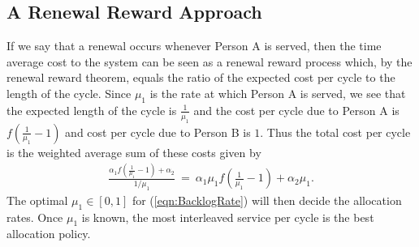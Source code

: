 \documentclass[10pt,a4paper]{article}
\begin{document}
\subsection{A Renewal Reward Approach}

If we say that a renewal occurs whenever Person A is served, then the time average cost to the system can be seen as a renewal reward process which, by the renewal reward theorem, equals the ratio of the  expected cost per cycle to the length of the cycle. Since $\mu_1$ is the rate at which Person A is served, we see that the expected length of the cycle is $\frac{1}{\mu_1}$ and the cost per cycle due to Person A is $f\left(\frac{1}{\mu_1}-1\right)$ and cost per cycle due to Person B is $1$. Thus the total cost per cycle is the weighted average sum of these costs given by  
\begin{align}
\label{eqn:BacklogRate}
\frac{\alpha_1f\left(\frac{1}{\mu_1}-1\right)+\alpha_2}{1/\mu_1} ~=~ \alpha_1 \mu_1 f\left(\frac{1}{\mu_1}-1\right)+\alpha_2 \mu_1.
\end{align}
%
%
%
%
%
%
%
%
The optimal $\mu_1 \in [0,1]$ for (\ref{eqn:BacklogRate}) will then decide the allocation rates. Once $\mu_1$ is known, the most interleaved service per cycle is the best allocation policy. 
\end{document}
